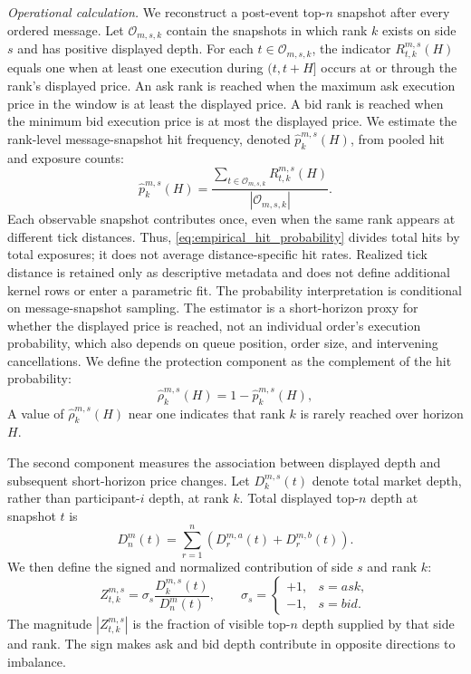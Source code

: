 \documentclass[11pt]{article}
\begin{document}
\emph{Operational calculation.} We reconstruct a post-event top-$n$ snapshot after every ordered message. Let
$\mathcal{O}_{m,s,k}$ contain the snapshots in which rank $k$ exists on side $s$ and has positive displayed depth. For
each $t\in\mathcal{O}_{m,s,k}$, the indicator $R^{m,s}_{t,k}(H)$ equals one when at least one execution during $(t,t+H]$ occurs
at or through the rank's displayed price. An ask rank is reached when the maximum ask execution price in the window is at least
the displayed price. A bid rank is reached when the minimum bid execution price is at most the displayed price. We estimate
the rank-level message-snapshot hit frequency, denoted $\widehat p^{m,s}_{k}(H)$, from pooled hit and exposure counts:
\begin{equation}
    \widehat p^{m,s}_{k}(H)
    =
    \frac{
        \sum_{t\in\mathcal{O}_{m,s,k}}R^{m,s}_{t,k}(H)
    }{
        |\mathcal{O}_{m,s,k}|
    }.
    \label{eq:empirical_hit_probability}
\end{equation}
Each observable snapshot contributes once, even when the same rank appears at different tick distances. Thus,
\cref{eq:empirical_hit_probability} divides total hits by total exposures; it does not average distance-specific hit rates.
Realized tick distance is retained only as descriptive metadata and does not define additional kernel rows or enter a
parametric fit. The probability interpretation is conditional on message-snapshot sampling. The estimator is a short-horizon
proxy for whether the displayed price is reached, not an individual order's execution probability, which also depends on
queue position, order size, and intervening cancellations.
We define the protection component as the complement of the hit probability:
\begin{equation}
    \widehat\rho^{m,s}_{k}(H)=1-\widehat p^{m,s}_{k}(H),
    \label{eq:empirical_protection_profile}
\end{equation}
A value of $\widehat\rho^{m,s}_{k}(H)$ near one indicates that rank $k$ is rarely reached over horizon $H$.

The second component measures the association between displayed depth and subsequent short-horizon price changes. Let
$D^{m,s}_{k}(t)$ denote total market depth, rather than participant-$i$ depth, at rank $k$. Total displayed top-$n$ depth at
snapshot $t$ is
\begin{equation}
    D^{m}_{n}(t)
    =
    \sum_{r=1}^{n}\left(D^{m,a}_{r}(t)+D^{m,b}_{r}(t)\right).
    \label{eq:total_topn_market_depth}
\end{equation}
We then define the signed and normalized contribution of side $s$ and rank $k$:
\begin{equation}
    Z^{m,s}_{t,k}
    =
    \sigma_s\frac{D^{m,s}_{k}(t)}{D^{m}_{n}(t)},
    \qquad
    \sigma_s= \begin{cases}
        +1, & s=ask,\\
        -1, & s=bid.
    \end{cases}
    \label{eq:normalized_level_contribution}
\end{equation}
The magnitude $|Z^{m,s}_{t,k}|$ is the fraction of visible top-$n$ depth supplied by that side and rank. The sign makes ask
and bid depth contribute in opposite directions to imbalance.
\end{document}
